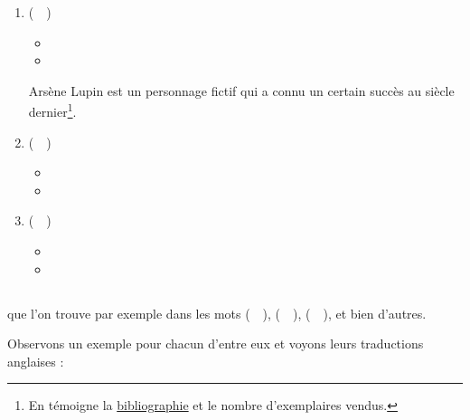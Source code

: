 \begin{enumerate}
\item {} (~~)
  \begin{itemize}
  \item {}
    \item {}
    \end{itemize}
    Arsène Lupin est un personnage fictif qui a connu un certain
    succès au siècle dernier\footnote{En témoigne la
      \href{https://www.amazon.fr/gp/product/B01N7I8WHS/ref=as_li_tl?ie=UTF8&camp=1642&creative=6746&creativeASIN=B01N7I8WHS&linkCode=as2&tag=wwwbecomefree-21&linkId=b8a42c0dbe0bb02385db28679d7e46fd}{bibliographie}
      et le nombre d'exemplaires vendus.}.
\item {} (~~)
  \begin{itemize}
  \item {}
  \item {}
  \end{itemize}
\item {} (~~)
  \begin{itemize}
  \item {}
  \item {}
  \end{itemize}
\end{enumerate}         

\subsection{}\label{subsec:ctfr}
 que l'on trouve par exemple dans les mots
 (~~),  (~~),  (~~), et bien d'autres.

Observons un exemple pour chacun d'entre eux et voyons leurs
traductions anglaises :\par

